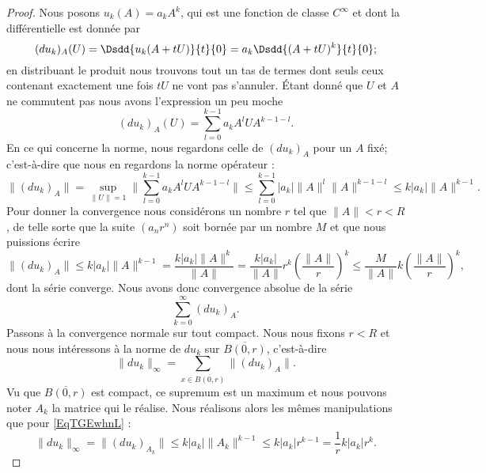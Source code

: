 \begin{proof}
	Nous posons \( u_k(A)=a_kA^k\), qui est une fonction de classe \(  C^{\infty}\) et dont la différentielle est donnée par
	\begin{equation}
		(du_k)_A(U)=\Dsdd{ u_k(A+tU) }{t}{0}=a_k\Dsdd{ (A+tU)^k }{t}{0};
	\end{equation}
	en distribuant le produit nous trouvons tout un tas de termes dont seuls ceux contenant exactement une fois \( tU\) ne vont pas s'annuler. Étant donné que \( U\) et \( A\) ne commutent pas nous avons l'expression un peu moche
	\begin{equation}
		(du_k)_A(U)=\sum_{l=0}^{k-1}a_kA^lUA^{k-1-l}.
	\end{equation}
	En ce qui concerne la norme, nous regardons celle de \( (du_k)_A\) pour un \( A\) fixé; c'est-à-dire que nous en regardons la norme opérateur :
	\begin{equation}
		\| (du_k)_A \|=\sup_{\| U \|=1}\| \sum_{l=0}^{k-1}a_kA^lUA^{k-1-l} \|\leq \sum_{l=0}^{k-1}| a_k |\| A \|^{l}\| A \|^{k-1-l}\leq k| a_k |\| A \|^{k-1}.
	\end{equation}
	Pour donner la convergence nous considérons un nombre \( r\) tel que \( \| A \|<r<R\), de telle sorte que la suite \( (a_nr^n)\) soit bornée par un nombre \( M\) et que nous puissions écrire
	\begin{equation}    \label{EqTGEwhnL}
		\| (du_k)_A \|\leq k| a_k |\| A \|^{k-1}=\frac{ k| a_k |\| A \|^k }{ \| A \| }=\frac{ k| a_k | }{ \| A \| }r^k\left( \frac{ \| A \| }{ r } \right)^k\leq \frac{ M }{ \| A \| }k\left( \frac{ \| A \| }{ r } \right)^k,
	\end{equation}
	dont la série converge. Nous avons donc convergence absolue de la série
	\begin{equation}
		\sum_{k=0}^{\infty}(du_k)_A.
	\end{equation}
	Passons à la convergence normale sur tout compact. Nous nous fixons \( r<R\) et nous nous intéressons à la norme de \( du_k\) sur \( \overline{ B(0,r) }\), c'est-à-dire
	\begin{equation}
		\| du_k \|_{\infty}=\sum_{x\in\overline{ B(0,r) }}\| (du_k)_A \|.
	\end{equation}
	Vu que \( \overline{ B(0,r) }\) est compact, ce supremum est un maximum et nous pouvons noter \( A_k\) la matrice qui le réalise. Nous réalisons alors les mêmes manipulations que pour \eqref{EqTGEwhnL} :
	\begin{equation}
		\| du_k \|_{\infty}=\| (du_k)_{A_k} \|\leq k| a_k |\| A_k \|^{k-1}\leq  k| a_k |r^{k-1}=\frac{1}{ r }k| a_k |r^k.

\end{equation}
\end{proof}
